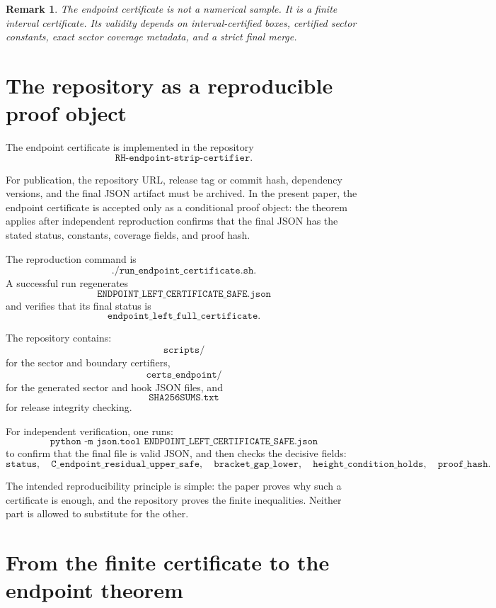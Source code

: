 \documentclass[11pt]{article}
\newtheorem{remark}[theorem]{Remark}
\begin{document}
\begin{remark}
The endpoint certificate is not a numerical sample.  It is a finite interval certificate.  Its validity depends on interval-certified boxes, certified sector constants, exact sector coverage metadata, and a strict final merge.
\end{remark}

\section{The repository as a reproducible proof object}

The endpoint certificate is implemented in the repository
\[
\texttt{RH-endpoint-strip-certifier}.
\]

For publication, the repository URL, release tag or commit hash, dependency
versions, and the final JSON artifact must be archived.  In the present paper,
the endpoint certificate is accepted only as a conditional proof object: the
theorem applies after independent reproduction confirms that the final JSON has
the stated status, constants, coverage fields, and proof hash.


The reproduction command is
\[
\texttt{./run\_endpoint\_certificate.sh}.
\]
A successful run regenerates
\[
\texttt{ENDPOINT\_LEFT\_CERTIFICATE\_SAFE.json}
\]
and verifies that its final status is
\[
\texttt{endpoint\_left\_full\_certificate}.
\]

The repository contains:
\[
\texttt{scripts/}
\]
for the sector and boundary certifiers,
\[
\texttt{certs\_endpoint/}
\]
for the generated sector and hook JSON files,
and
\[
\texttt{SHA256SUMS.txt}
\]
for release integrity checking.

For independent verification, one runs:
\[
\texttt{python -m json.tool ENDPOINT\_LEFT\_CERTIFICATE\_SAFE.json}
\]
to confirm that the final file is valid JSON, and then checks the decisive fields:
\[
\texttt{status},
\quad
\texttt{C\_endpoint\_residual\_upper\_safe},
\quad
\texttt{bracket\_gap\_lower},
\quad
\texttt{height\_condition\_holds},
\quad
\texttt{proof\_hash}.
\]

The intended reproducibility principle is simple: the paper proves why such a certificate is enough, and the repository proves the finite inequalities.  Neither part is allowed to substitute for the other.


\section{From the finite certificate to the endpoint theorem}
\end{document}

